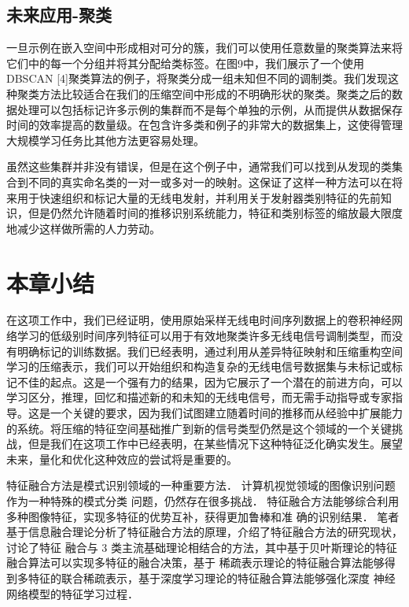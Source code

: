 \subsection{未来应用-聚类}
一旦示例在嵌入空间中形成相对可分的簇，我们可以使用任意数量的聚类算法来将它们中的每一个分组并将其分配给类标签。在图9中，我们展示了一个使用DBSCAN [4]聚类算法的例子，将聚类分成一组未知但不同的调制类。我们发现这种聚类方法比较适合在我们的压缩空间中形成的不明确形状的聚类。聚类之后的数据处理可以包括标记许多示例的集群而不是每个单独的示例，从而提供从数据保存时间的效率提高的数量级。在包含许多类和例子的非常大的数据集上，这使得管理大规模学习任务比其他方法更容易处理。\par
虽然这些集群并非没有错误，但是在这个例子中，通常我们可以找到从发现的类集合到不同的真实命名类的一对一或多对一的映射。这保证了这样一种方法可以在将来用于快速组织和标记大量的无线电发射，并利用关于发射器类别特征的先前知识，但是仍然允许随着时间的推移识别系统能力，特征和类别标签的缩放最大限度地减少这样做所需的人力劳动。\par


\section{本章小结}
在这项工作中，我们已经证明，使用原始采样无线电时间序列数据上的卷积神经网络学习的低级别时间序列特征可以用于有效地聚类许多无线电信号调制类型，而没有明确标记的训练数据。我们已经表明，通过利用从差异特征映射和压缩重构空间学习的压缩表示，我们可以开始组织和构造复杂的无线电信号数据集与未标记或标记不佳的起点。这是一个强有力的结果，因为它展示了一个潜在的前进方向，可以学习区分，推理，回忆和描述新的和未知的无线电信号，而无需手动指导或专家指导。这是一个关键的要求，因为我们试图建立随着时间的推移而从经验中扩展能力的系统。将压缩的特征空间基础推广到新的信号类型仍然是这个领域的一个关键挑战，但是我们在这项工作中已经表明，在某些情况下这种特征泛化确实发生。展望未来，量化和优化这种效应的尝试将是重要的。\par

特征融合方法是模式识别领域的一种重要方法． 计算机视觉领域的图像识别问题作为一种特殊的模式分类
问题，仍然存在很多挑战． 特征融合方法能够综合利用多种图像特征，实现多特征的优势互补，获得更加鲁棒和准
确的识别结果． 笔者基于信息融合理论分析了特征融合方法的原理，介绍了特征融合方法的研究现状，讨论了特征
融合与 3 类主流基础理论相结合的方法，其中基于贝叶斯理论的特征融合算法可以实现多特征的融合决策，基于
稀疏表示理论的特征融合算法能够得到多特征的联合稀疏表示，基于深度学习理论的特征融合算法能够强化深度
神经网络模型的特征学习过程．\par
